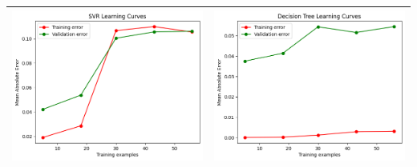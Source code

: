 \begin{table}[H]
    \centering
    \footnotesize
    \setlength\tabcolsep{0pt}
    \begin{tabularx}{\textwidth}{|X|X|}
        \hline
        \includegraphics[width=\linewidth, trim=0 0 0 0]{images/SVR_lc70_Azure.png} &
        \includegraphics[width=\linewidth, trim=0 0 0 0]{images/DecisionTree_lc70_Azure.png} \\
        \hline

\end{tabularx}
\end{table}
